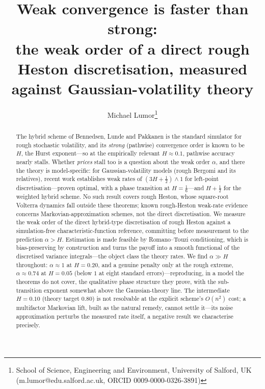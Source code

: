 \documentclass{siamonline250211}
\title{Weak convergence is faster than strong:\\
the weak order of a direct rough Heston discretisation,
measured against Gaussian-volatility theory}
\author{Michael Lumor\thanks{School of Science, Engineering and Environment,
University of Salford, UK (m.lumor@edu.salford.ac.uk, ORCID 0009-0000-0326-3891)}}
\begin{document}
\maketitle

\begin{abstract}
The hybrid scheme of Bennedsen, Lunde and Pakkanen is the standard simulator for
rough stochastic volatility, and its \emph{strong} (pathwise) convergence order is
known to be $H$, the Hurst exponent---so at the empirically relevant $H\approx 0.1$,
pathwise accuracy nearly stalls. Whether \emph{prices} stall too is a question about
the weak order $\alpha$, and there the theory is model-specific: for Gaussian-volatility
models (rough Bergomi and its relatives), recent work establishes weak rates of
$(3H+\tfrac12)\wedge 1$ for left-point discretisation---proven optimal, with a phase
transition at $H=\tfrac16$---and $H+\tfrac12$ for the weighted hybrid scheme. No such
result covers rough Heston, whose square-root Volterra dynamics fall outside these
theorems; known rough-Heston weak-rate evidence concerns Markovian-approximation
schemes, not the direct discretisation. We measure the weak order of the direct
hybrid-type discretisation of rough Heston against a simulation-free
characteristic-function reference, committing before measurement to the prediction
$\alpha>H$. Estimation is made feasible by Romano--Touzi conditioning, which is
bias-preserving by construction and turns the payoff into a smooth functional of the
discretised variance integrals---the object class the theory rates. We find
$\alpha\gg H$ throughout: $\alpha\approx 1$ at $H=0.20$, and a genuine penalty only at
the rough extreme, $\alpha\approx 0.74$ at $H=0.05$ (below $1$ at eight standard
errors)---reproducing, in a model the theorems do not cover, the qualitative phase
structure they prove, with the sub-transition exponent somewhat above the
Gaussian-theory line. The intermediate $H=0.10$ (theory target $0.80$) is not
resolvable at the explicit scheme's $O(n^2)$ cost; a multifactor Markovian lift,
built as the natural remedy, cannot settle it---its noise approximation perturbs the
measured rate itself, a negative result we characterise precisely.
\end{abstract}
\end{document}
